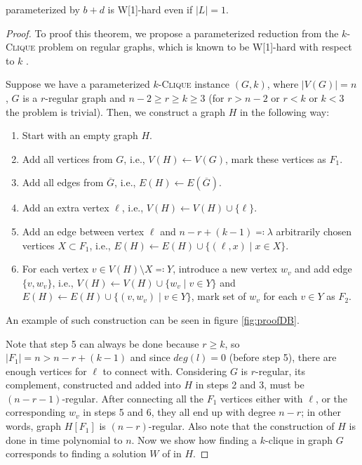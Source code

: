\begin{theorem}
    \HL parameterized by $b + d$ is W[1]-hard even if $|L| = 1$.
\end{theorem}
\begin{proof}\label{proofDB}
    To proof this theorem, we propose a parameterized reduction from the $k$-\textsc{Clique} problem on regular graphs,
    which is known to be W[1]-hard with respect to $k$ \cite{Mathieson2008}.
    
    Suppose we have a parameterized $k$-\textsc{Clique} instance $(G, k)$, where $|V(G)|=n$, $G$ is a $r$-regular graph and $n-2 \geq r \geq k \geq 3$
    (for $r > n-2$ or $r < k$ or $k < 3$ the problem is trivial).
    Then, we construct a graph $H$ in the following way:
    \begin{enumerate}
        \item Start with an empty graph $H$.
        \item Add all vertices from $G$, i.e., $V(H) \leftarrow V(G)$, mark these vertices as $F_1$.
        \item Add all edges from $\overline{G}$, i.e., $E(H) \leftarrow E(\overline{G})$.
        \item Add an extra vertex $\ell$, i.e., $V(H) \leftarrow V(H) \cup \{\ell\}$.
        \item Add an edge between vertex $\ell$ and $n - r + (k - 1) \eqqcolon \lambda$ arbitrarily chosen vertices $X \subset F_1$,
              i.e., $E(H) \leftarrow E(H) \cup \{ (\ell, x) \mid x \in X \}$.
        \item For each vertex $v \in V(H) \setminus X \eqqcolon Y$, introduce a new vertex $w_v$ and add edge $\{v, w_v\}$, i.e.,
              $V(H) \leftarrow V(H) \cup \{ w_v \mid v \in Y \}$ and $E(H) \leftarrow E(H) \cup \{ (v, w_v) \mid v \in Y \}$,
              mark set of $w_v$ for each $v \in Y$ as $F_2$.
    \end{enumerate}
    An example of such construction can be seen in figure \ref{fig:proofDB}.

    Note that step 5 can always be done because $r \ge k$, so $|F_1| = n > n - r + (k - 1)$
    and since $deg(l) = 0$ (before step 5), there are enough vertices for $\ell$ to connect with.
    Considering $G$ is $r$-regular, its complement, constructed and added into $H$ in steps 2 and 3, must be $(n-r-1)$-regular.
    After connecting all the $F_1$ vertices either with $\ell$, or the corresponding $w_v$ in steps 5 and 6,
    they all end up with degree $n-r$; in other words, graph $H[F_1]$ is $(n-r)$-regular.
    Also note that the construction of $H$ is done in time polynomial to $n$.
    Now we show how finding a $k$-clique in graph $G$ corresponds to finding a solution $W$ of \HLshort in $H$.


\end{proof}
